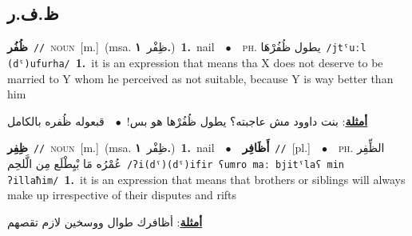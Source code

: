\documentclass[10pt,a4paper,twoside]{article} %
\begin{document}
\begin{multicols}{2}
\vspace{-3mm}
\subsection*{\color{blue}\foreignlanguage{arabic}{ظ.ف.ر}\color{blue}{}} 

{\setlength\topsep{0pt}\textbf{\foreignlanguage{arabic}{ظُفُر}}\ {\color{gray}\texttt{//}\color{black}}\ \textsc{noun}\ [m.]\ \color{gray}(msa. \foreignlanguage{arabic}{ظِفْر}~\foreignlanguage{arabic}{\textbf{١.}})\color{black}\ \textbf{1.}~nail\ \ $\bullet$\ \ \textsc{ph.} \color{gray} \foreignlanguage{arabic}{يطول ظُفُرْهَا}\color{black}\ {\color{gray}\texttt{/{\sffamily jtˤuːl (dˤ)ufurha}/}\color{black}}\ \textbf{1.}~it is an expression that means tha X does not deserve to be married to Y whom he perceived as not suitable, because Y is way better than him\  \begin{flushright}\color{gray}\foreignlanguage{arabic}{\textbf{\underline{\foreignlanguage{arabic}{أمثلة}}}: بنت داوود مش عاجبته؟ يطول ظُفُرْها هو بس!\ $\bullet$\ \  قبعوله ظُفره بالكامل}\end{flushright}\color{black}} \vspace{2mm}

{\setlength\topsep{0pt}\textbf{\foreignlanguage{arabic}{ظِفِر}}\ {\color{gray}\texttt{//}\color{black}}\ \textsc{noun}\ [m.]\ \color{gray}(msa. \foreignlanguage{arabic}{ظِفْر}~\foreignlanguage{arabic}{\textbf{١.}})\color{black}\ \textbf{1.}~nail\ \ $\bullet$\ \ \setlength\topsep{0pt}\textbf{\foreignlanguage{arabic}{أَظَافِر}}\ {\color{gray}\texttt{//}\color{black}}\ [pl.]\ \ $\bullet$\ \ \textsc{ph.} \color{gray} \foreignlanguage{arabic}{الظِّفِر عُمْرُه مَا بْيِطْلَع مِن الَّلحِم}\color{black}\ {\color{gray}\texttt{/{\sffamily ʔi(dˤ)(dˤ)ifir ʕumro maː bjitˤlaʕ min ʔillaħim}/}\color{black}}\ \textbf{1.}~it is an expression that means that brothers or siblings will always make up irrespective of their disputes and rifts\  \begin{flushright}\color{gray}\foreignlanguage{arabic}{\textbf{\underline{\foreignlanguage{arabic}{أمثلة}}}: أظافرك طوال ووسخين لازم تقصهم}\end{flushright}\color{black}} \vspace{2mm}


\end{multicols}
\end{document}
